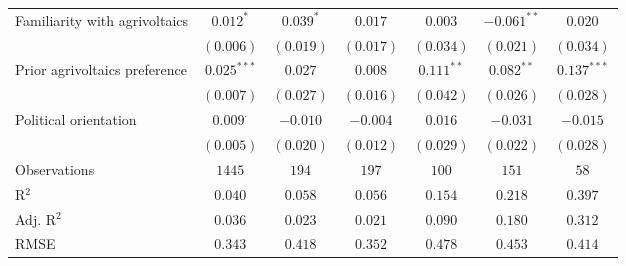 \begin{center}
\begin{small}
\begin{longtable}{l@{} c@{} c@{} c@{} c@{} c@{} c@{}}
\quad Familiarity with agrivoltaics & $0.012^{*}$      & $0.039^{*}$ & $0.017$          & $0.003$      & $-0.061^{**}$ & $0.020$          \\
                                    & $(0.006)$        & $(0.019)$   & $(0.017)$        & $(0.034)$    & $(0.021)$     & $(0.034)$        \\
\quad Prior agrivoltaics preference & $0.025^{***}$    & $0.027$     & $0.008$          & $0.111^{**}$ & $0.082^{**}$  & $0.137^{***}$    \\
                                    & $(0.007)$        & $(0.027)$   & $(0.016)$        & $(0.042)$    & $(0.026)$     & $(0.028)$        \\
\quad Political orientation         & $0.009^{\cdot}$  & $-0.010$    & $-0.004$         & $0.016$      & $-0.031$      & $-0.015$         \\
                                    & $(0.005)$        & $(0.020)$   & $(0.012)$        & $(0.029)$    & $(0.022)$     & $(0.028)$        \\
\hline
Observations                        & $1445$           & $194$       & $197$            & $100$        & $151$         & $58$             \\
R$^2$                               & $0.040$          & $0.058$     & $0.056$          & $0.154$      & $0.218$       & $0.397$          \\
Adj. R$^2$                          & $0.036$          & $0.023$     & $0.021$          & $0.090$      & $0.180$       & $0.312$          \\
RMSE                                & $0.343$          & $0.418$     & $0.352$          & $0.478$      & $0.453$       & $0.414$          \\
\end{longtable}
\end{small}
\end{center}
